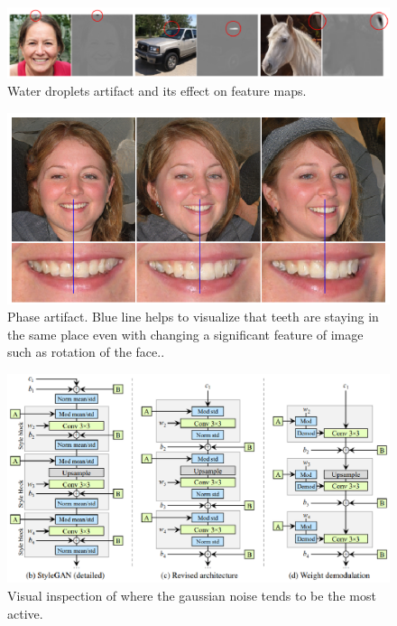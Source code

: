 \documentclass[11pt,a4paper,openany]{book}
\begin{document}
\begin{figure}[ht!]
    \centering
    \includegraphics[scale=1.0]{figs/water-droplets.eps}
    \caption{Water droplets artifact and its effect on feature maps. \cite{stylegan2}}\label{Fig:STYLEGAN}
\end{figure}


\begin{figure}[ht!]
    \centering
    \includegraphics[scale=1.2]{figs/phase.eps}
    \caption{Phase artifact. Blue line helps to visualize that teeth are staying in the same place even with changing a significant feature of image such as rotation of the face..}\label{Fig:STYLEGAN}
\end{figure}


\begin{figure}[ht!]
    \centering
    \includegraphics[scale=1.0]{figs/stylegan2-scheme2.eps}
    \caption{Visual inspection of where the gaussian noise tends to be the most active.}\label{Fig:STYLEGAN}
\end{figure}
\end{document}

